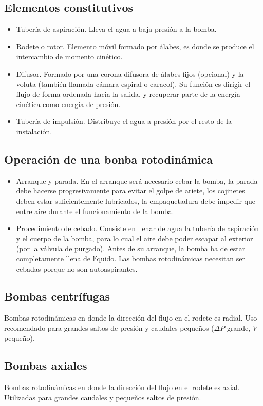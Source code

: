 \subsection{Elementos constitutivos}
\begin{itemize}
    \item Tubería de aspiración. Lleva el agua a baja presión a la bomba.
    \item Rodete o rotor. Elemento móvil formado por álabes, es donde se produce el intercambio de momento cinético.
    \item Difusor. Formado por una corona difusora de álabes fijos (opcional) y la voluta (también llamada cámara espiral o caracol). Su función es dirigir el flujo de forma ordenada hacia la salida, y recuperar parte de la energía cinética como energía de presión.
    \item Tubería de impulsión. Distribuye el agua a presión por el resto de la instalación.
\end{itemize}

\subsection{Operación de una bonba rotodinámica}
\begin{itemize}
    \item Arranque y parada. En el arranque será necesario cebar la bomba, la parada debe hacerse progresivamente para evitar el golpe de ariete, los cojinetes deben estar suficientemente lubricados, la empaquetadura debe impedir que entre aire durante el funcionamiento de la bomba.
    \item Procedimiento de cebado. Consiste en llenar de agua la tubería de aspiración y el cuerpo de la bomba, para lo cual el aire debe poder escapar al exterior (por la válvula de purgado). Antes de su arranque, la bomba ha de estar completamente llena de líquido. Las bombas rotodinámicas necesitan ser cebadas porque no son autoaspirantes.
\end{itemize}

\subsection{Bombas centrífugas}
Bombas rotodinámicas en donde la dirección del flujo en el rodete es radial. Uso recomendado para grandes saltos de presión y caudales pequeños ($\Delta P$ grande, $\dot{V}$ pequeño).

\subsection{Bombas axiales}
Bombas rotodinámicas en donde la dirección del flujo en el rodete es axial. Utilizadas para grandes caudales y pequeños saltos de presión.

